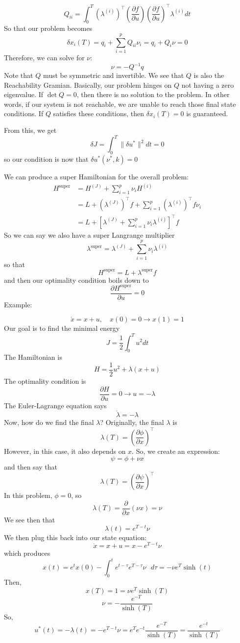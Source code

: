 \documentclass{article}
\begin{document}
\[Q_{ii} = \int_{0}^{T}(\lambda^{(i)})^\top\left(\frac{\partial f}{\partial u}\right)
\left(\frac{\partial f}{\partial u}\right)^\top\lambda^{(i)}dt\]
So that our problem becomes
\[\delta x_i(T) = q_i + \sum_{i=1}^{p}Q_{ii}\nu_i = q_i + Q_i\nu = 0\]
Therefore, we can solve for $\nu$:
\[\nu = -Q^{-1}q\]
Note that $Q$ must be symmetric and invertible. We see that $Q$ is also the Reachability Gramian.
Basically, our problem hinges on $Q$ not having a zero eigenvalue. If $\det Q = 0$, then
there is no solution to the problem. In other words, if our system is not reachable, we are unable
to reach those final state conditions. If $Q$ satisfies these conditions, then $\delta x_i(T) = 0$
is guaranteed.

\noindent
From this, we get
\[\delta J = \int_{0}^{T}\|\delta u^*\|^2dt = 0\]
so our condition is now that $\delta u^*(\nu^*, k) = 0$

\noindent
We can produce a super Hamiltonian for the overall problem:
\begin{align*}
    H^\text{super} &= H^{(J)} + \sum_{i=1}^{p}\nu_i H^{(i)} \\
    &= L + (\lambda^{(J)})^\top f + \sum_{i=1}^{p}(\lambda^{(i)})^\top f \nu_i \\
    &= L + \left[\lambda^{(J)} + \sum_{i=1}^{p}\nu_i \lambda^{(i)}\right]^\top f
\end{align*}
So we can say we also have a super Langrange multiplier
\[\lambda^\text{super} = \lambda^{(J)} + \sum_{i=1}^{p}\nu_i \lambda^{(i)}\]
so that
\[H^\text{super} = L + \lambda^\text{super}f\]
and then our optimality condition boils down to
\[\frac{\partial H^\text{super}}{\partial u} = 0\]
Example:

\[\dot{x} = x + u, \quad x(0) = 0 \rightarrow x(1) = 1\]
Our goal is to find the minimal energy
\[J = \frac{1}{2}\int_{0}^{T}u^2 dt\]
The Hamiltonian is
\[H = \frac{1}{2}u^2 + \lambda(x + u)\]
The optimality condition is
\[\frac{\partial H}{\partial u} = 0 \rightarrow u = -\lambda\]
The Euler-Lagrange equation says
\[\dot{\lambda} = -\lambda\]
Now, how do we find the final $\lambda$? Originally, the final $\lambda$ is
\[\lambda(T) = \left(\frac{\partial\phi}{\partial x}\right)^\top\]
However, in this case, it also depends on $x$. So, we create an expression:
\[\psi = \phi + \nu x\]
and then say that
\[\lambda(T) = \left(\frac{\partial\psi}{\partial x}\right)^\top\]
In this problem, $\phi = 0$, so
\[\lambda(T) = \frac{\partial}{\partial x}(\nu x) = \nu\]
We see then that
\[\lambda(t) = e^{T-t}\nu\]
We then plug this back into our state equation:
\[\dot{x} = x + u = x - e^{T-t}\nu\]
which produces
\[x(t) = e^t x(0) - \int_{0}^{t}e^{t-\tau}e^{T-\tau}\nu\text{ }d\tau = -\nu e^T \sinh(t)\]
Then,
\[x(T) = 1 = \nu e^T \sinh(T)\]
\[\nu = -\frac{e^{-T}}{\sinh(T)}\]
So,
\[u^*(t) = -\lambda(t) = -e^{T-t}\nu = e^{T}e^{-t}\frac{e^{-T}}{\sinh(T)} = \frac{e^{-t}}{\sinh(T)}\]
\end{document}
